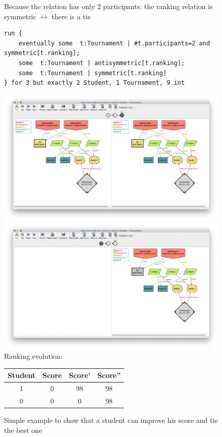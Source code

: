 \begin{figure}[h]
\caption{Simple example to show that a student can improve his score and tie the best one}

Because the relation has only 2 participants: the ranking relation is symmetric $\leftrightarrow$ there is a tie
\centering
\begin{lstlisting}[language=alloy]
run {
	eventually some  t:Tournament | #t.participants=2 and symmetric[t.ranking];
	some  t:Tournament | antisymmetric[t.ranking];
	some  t:Tournament | symmetric[t.ranking]
} for 3 but exactly 2 Student, 1 Tournament, 9 int
\end{lstlisting}

\includegraphics[width=\textwidth]{Images/Last example 1.png}
\includegraphics[width=\textwidth]{Images/Last example 2.png}
Ranking evolution:

\begin{tabular}{c||c|c|c}
    Student & Score & Score' & Score''\\
    \hline
    1 & 0 & 98 & 98\\
    0 & 0 & 0 & 98\\
\end{tabular}

\end{figure}